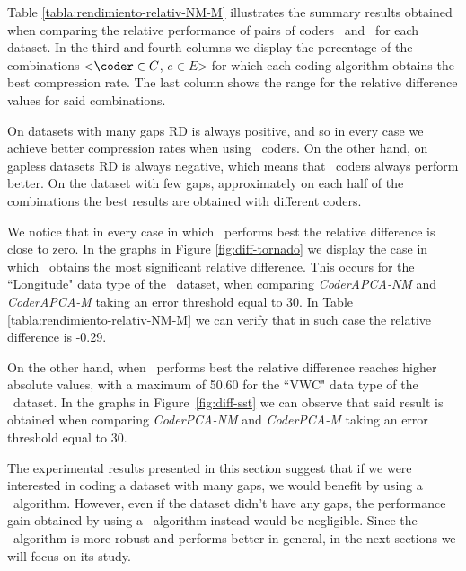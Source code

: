 Table \ref{tabla:rendimiento-relativ-NM-M} illustrates the summary results obtained when comparing the relative performance of pairs of coders \cNOmaskalgo \ and \cmaskalgo \ for each dataset. In the third and fourth columns we display the percentage of the combinations  <$\coder \in C$, $e \in E$> for which each coding algorithm obtains the best compression rate. The last column shows the range for the relative difference values for said combinations.

\vspace{+5pt}

\vspace{-5pt}

On datasets with many gaps RD is always positive, and so in every case we achieve better compression rates when using \cmaskalgo \ coders. On the other hand, on gapless datasets RD is always negative, which means that \cNOmaskalgo \ coders always perform better. On the dataset with few gaps, approximately on each half of the combinations the best results are obtained with different coders.

We notice that in every case in which \cNOmaskalgo \ performs best the relative difference is close to zero. In the graphs in Figure \ref{fig:diff-tornado} we display the case in which \cNOmaskalgo \ obtains the most significant relative difference. This occurs for the ``Longitude" data type of the \datasettornado \ dataset, when comparing \textit{CoderAPCA-NM} and \textit{CoderAPCA-M} taking an error threshold equal to 30. In Table \ref{tabla:rendimiento-relativ-NM-M} we can verify that in such case the relative difference is -0.29.

On the other hand, when \cmaskalgo \ performs best the relative difference reaches higher absolute values, with a maximum of 50.60 for the ``VWC" data type of the \datasetsst \ dataset. In the graphs in Figure~\ref{fig:diff-sst} we can observe that said result is obtained when comparing \textit{CoderPCA-NM} and \textit{CoderPCA-M} taking an error threshold equal to 30.

The experimental results presented in this section suggest that if we were interested in coding a dataset with many gaps, we would benefit by using a \cmaskalgo \ algorithm. However, even if the dataset didn't have any gaps, the performance gain obtained by using a \cNOmaskalgo \ algorithm instead would be negligible. Since the \cmaskalgo \ algorithm is more robust and performs better in general, in the next sections we will focus on its study.

